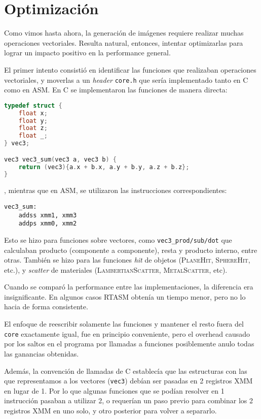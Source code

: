 \section{Optimización} \label{sec:optimizacion}

Como vimos hasta ahora, la generación de imágenes requiere realizar muchas
operaciones vectoriales. Resulta natural, entonces, intentar optimizarlas para
lograr un impacto positivo en la performance general.

El primer intento consistió en identificar las funciones que realizaban
operaciones vectoriales, y moverlas a un \textit{header} \texttt{core.h} que
sería implementado tanto en C como en ASM. En C se implementaron las funciones
de manera directa:

\begin{lstlisting}[language=C]
typedef struct {
    float x;
    float y;
    float z;
    float _;
} vec3;

vec3 vec3_sum(vec3 a, vec3 b) {
    return (vec3){a.x + b.x, a.y + b.y, a.z + b.z};
}
\end{lstlisting}

, mientras que en ASM, se utilizaron las instrucciones correspondientes:

\begin{lstlisting}[language={[x86masm]Assembler}]
vec3_sum:
    addss xmm1, xmm3
    addps xmm0, xmm2
\end{lstlisting}

Esto se hizo para funciones sobre vectores, como \texttt{vec3\_prod/sub/dot} que
calculaban producto (componente a componente), resta y producto interno, entre
otras. También se hizo para las funciones \textit{hit} de objetos (\textsc{PlaneHit},
\textsc{SphereHit}, etc.), y \textit{scatter} de materiales
(\textsc{LambertianScatter}, \textsc{MetalScatter}, etc).

Cuando se comparó la performance entre las implementaciones, la diferencia era
insignificante. En algunos casos RTASM obtenía un tiempo menor, pero no lo hacia
de forma consistente.

El enfoque de reescribir solamente las funciones y mantener el resto fuera del
\texttt{core} exactamente igual, fue en principio conveniente, pero el overhead
causado por los saltos en el programa por llamadas a funciones posiblemente
anulo todas las ganancias obtenidas.

Además, la convención de llamadas de C establecía que las estructuras con las
que representamos a los vectores (\texttt{vec3}) debían ser pasadas en 2
registros XMM en lugar de 1. Por lo que algunas funciones que se podían resolver
en 1 instrucción pasaban a utilizar 2, o requerían un paso previo para combinar
los 2 registros XMM en uno solo, y otro posterior para volver a separarlo.

